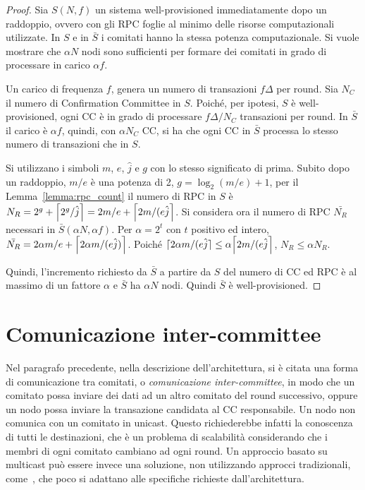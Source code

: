 \begin{proof}
Sia $S(N, f)$ un sistema well-provisioned immediatamente dopo un raddoppio, ovvero con gli RPC foglie al minimo delle risorse computazionali utilizzate. In $S$ e in $\bar{S}$ i comitati hanno la stessa potenza computazionale. Si vuole mostrare che $\alpha N$ nodi sono sufficienti per formare dei comitati in grado di processare in carico $\alpha f$.

Un carico di frequenza $f$, genera un numero di transazioni $f \Delta$ per round. Sia $N_C$ il numero di Confirmation Committee in $S$. Poiché, per ipotesi, $S$ è well-provisioned, ogni CC è in grado di processare $f \Delta / N_C$ transazioni per round. In $\bar{S}$ il carico è $\alpha f$, quindi, con $\alpha N_C$ CC, si ha che ogni CC in $\bar{S}$ processa lo stesso numero di transazioni che in $S$.

Si utilizzano i simboli $m$, $e$, $\hat{j}$ e $g$ con lo stesso significato di prima.
Subito dopo un raddoppio, $m/e$ è una potenza di 2, $g= \log_2 (m/e) +1$, per il Lemma~\ref{lemma:rpc_count} il numero di RPC in $S$ è $N_R = 2^g + \ceil*{2^g/\hat{j}} = 2m/e + \ceil*{2 m/ (e \hat{j}}$. Si considera ora il numero di RPC $\bar{N_R}$ necessari in $\bar{S}(\alpha N, \alpha f)$. Per $\alpha = 2^t$ con $t$ positivo ed intero, $\bar{N_R} = 2 \alpha m / e + \ceil*{2 \alpha m / (e \hat{j})}$. Poiché $\ceil{2 \alpha m/(e \hat{j}} \leq \alpha \ceil*{2 m / (e \hat{j}}$, $N_R \leq \alpha N_R$.

Quindi, l'incremento richiesto da $\bar{S}$ a partire da $S$ del numero di CC ed RPC è al massimo di un fattore $\alpha$ e $\bar{S}$ ha $\alpha N$ nodi. Quindi $\bar{S}$ è well-provisioned.
\end{proof}


\section{Comunicazione inter-committee}

Nel paragrafo precedente, nella descrizione dell'architettura, si è citata una forma di comunicazione tra comitati, o \emph{comunicazione inter-committee}, in modo che un comitato possa inviare dei dati ad un altro comitato del round successivo, oppure un nodo possa inviare la transazione candidata al CC responsabile.
Un nodo non comunica con un comitato in unicast. Questo richiederebbe infatti la conoscenza di tutti le destinazioni, che è un problema di scalabilità considerando che i membri di ogni comitato cambiano ad ogni round. Un approccio basato su multicast può essere invece una soluzione, non utilizzando approcci tradizionali, come~\cite{fenner2016protocol}, che poco si adattano alle specifiche richieste dall'architettura.

